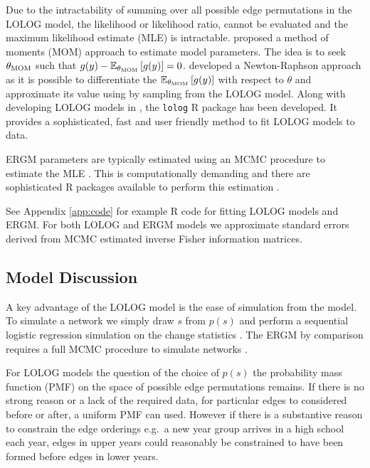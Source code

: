 \documentclass[
]{statsoc}
\begin{document}
Due to the intractability of summing over all possible edge permutations
in the LOLOG model, the likelihood or likelihood ratio, cannot be
evaluated and the maximum likelihood estimate (MLE) is intractable.
\cite{Fellows2018} proposed a method of moments (MOM) approach to
estimate model parameters. The idea is to seek \(\theta_{{\rm MOM}}\)
such that
\(g(y) - \mathbb{E}_{\theta_{{\rm MOM}}}\left[ g(y) \right] = 0\).
\cite{Fellows2018} developed a Newton-Raphson approach as it is possible
to differentiate the
\(\mathbb{E}_{\theta_{{\rm MOM}}}\left[ g(y) \right]\) with respect to
\(\theta\) and approximate its value using by sampling from the LOLOG
model. Along with developing LOLOG models in \cite{Fellows2018}, the
\texttt{lolog} R package \citep{LOLOG_github} has been developed. It
provides a sophisticated, fast and user friendly method to fit LOLOG
models to data.

ERGM parameters are typically estimated using an MCMC procedure to
estimate the MLE \citep{Snijders2002,Hunter2006}. This is
computationally demanding and there are sophisticated R packages
available to perform this estimation \citep{ergm_3_9_4}.

See Appendix \ref{app:code} for example R code for fitting LOLOG models
and ERGM. For both LOLOG and ERGM models we approximate standard errors
derived from MCMC estimated inverse Fisher information matrices.

\subsection{Model Discussion}\label{sec:comparison}

A key advantage of the LOLOG model is the ease of simulation from the
model. To simulate a network we simply draw \(s\) from \(p(s)\) and
perform a sequential logistic regression simulation on the change
statistics \citep{LOLOG_github}. The ERGM by comparison requires a full
MCMC procedure to simulate networks \citep{ergm_3_9_4}.

For LOLOG models the question of the choice of \(p(s)\) the probability
mass function (PMF) on the space of possible edge permutations remains.
If there is no strong reason or a lack of the required data, for
particular edges to considered before or after, a uniform PMF can used.
However if there is a substantive reason to constrain the edge orderings
e.g.~a new year group arrives in a high school each year, edges in upper
years could reasonably be constrained to have been formed before edges
in lower years.
\end{document}
